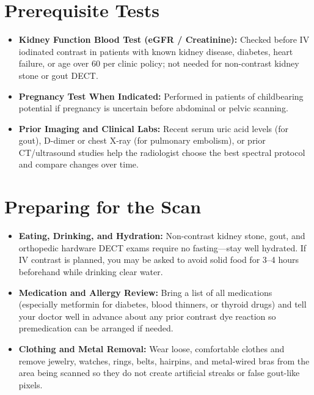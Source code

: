 \section{Prerequisite Tests}
\begin{itemize}
\item \textbf{Kidney Function Blood Test (eGFR / Creatinine):} Checked before IV iodinated contrast in patients with known kidney disease, diabetes, heart failure, or age over 60 per clinic policy; not needed for non-contrast kidney stone or gout DECT.
\item \textbf{Pregnancy Test When Indicated:} Performed in patients of childbearing potential if pregnancy is uncertain before abdominal or pelvic scanning.
\item \textbf{Prior Imaging and Clinical Labs:} Recent serum uric acid levels (for gout), D-dimer or chest X-ray (for pulmonary embolism), or prior CT/ultrasound studies help the radiologist choose the best spectral protocol and compare changes over time.
\end{itemize}

\section{Preparing for the Scan}
\begin{itemize}
\item \textbf{Eating, Drinking, and Hydration:} Non-contrast kidney stone, gout, and orthopedic hardware DECT exams require no fasting---stay well hydrated. If IV contrast is planned, you may be asked to avoid solid food for 3--4 hours beforehand while drinking clear water.
\item \textbf{Medication and Allergy Review:} Bring a list of all medications (especially metformin for diabetes, blood thinners, or thyroid drugs) and tell your doctor well in advance about any prior contrast dye reaction so premedication can be arranged if needed.
\item \textbf{Clothing and Metal Removal:} Wear loose, comfortable clothes and remove jewelry, watches, rings, belts, hairpins, and metal-wired bras from the area being scanned so they do not create artificial streaks or false gout-like pixels.
\end{itemize}

